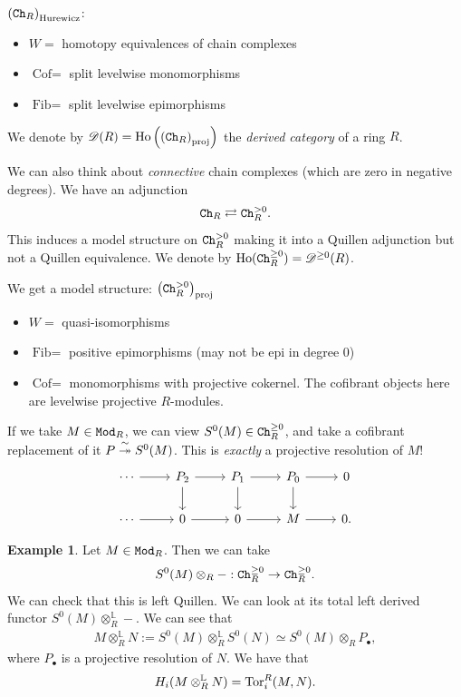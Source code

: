 \documentclass[12pt]{amsart}
\theoremstyle{definition}
\newtheorem{example}[theorem]{Example}
\providecommand{\Cof}{\text{Cof}}
\providecommand{\Fib}{\text{Fib}}
\begin{document}
$\left( \texttt{Ch}_R \right)_\text{Hurewicz}$:
\begin{itemize}
    \item $W=$ homotopy equivalences of chain complexes
    \item $\Cof=$ split levelwise monomorphisms
    \item $\Fib=$ split levelwise epimorphisms
\end{itemize}

We denote by $\mathscr{D}(R) = \text{Ho} \left( \left( \texttt{Ch}_R \right)_\text{proj} \right)$ the \textit{derived category} of a ring $R$.

We can also think about \textit{connective} chain complexes (which are zero in negative degrees). We have an adjunction
\begin{align*}
    \texttt{Ch}_R \rightleftarrows \texttt{Ch}_R^{>0}.
\end{align*}
This induces a model structure on $\texttt{Ch}_R^{>0}$ making it into a Quillen adjunction but not a Quillen equivalence. We denote by $\text{Ho}(\texttt{Ch}_R^{\ge 0}) = \mathscr{D}^{\ge 0}(R)$.

We get a model structure:
$\left( \texttt{Ch}_R^{>0} \right)_\text{proj}$
\begin{itemize}
    \item $W=$ quasi-isomorphisms
    \item $\Fib=$ positive epimorphisms (may not be epi in degree 0)
    \item $\Cof=$ monomorphisms with projective cokernel. The cofibrant objects here are levelwise projective $R$-modules.
\end{itemize}


If we take $M \in \texttt{Mod}_R$, we can view $S^0(M) \in \texttt{Ch}_R^{\ge 0}$, and take a cofibrant replacement of it $P \overset{\sim}{\twoheadrightarrow} S^0(M)$. This is \textit{exactly} a projective resolution of $M$!
\[ \begin{tikzcd}
    \cdots\rar & P_2\dar\rar & P_1\dar\rar & P_0\dar\rar & 0\\
    \cdots \rar & 0\rar & 0\rar & M\rar & 0.
\end{tikzcd} \]
%
\begin{example} Let $M \in \texttt{Mod}_R$. Then we can take
\begin{align*}
    S^0(M) \otimes_R - : \texttt{Ch}_R^{\ge 0} \to \texttt{Ch}_R^{\ge 0}.
\end{align*}
We can check that this is left Quillen. We can look at its total left derived functor $S^0(M) \otimes_R^{\mathbb{L}} -$. We can see that
\begin{align*}
    M \otimes_R^{\mathbb{L}} N := S^0(M) \otimes_R^{\mathbb{L}} S^0(N) \simeq S^0(M) \otimes_R P_\bullet,
\end{align*}
where $P_\bullet$ is a projective resolution of $N$. We have that
\begin{align*}
    H_i(M \otimes_R^{\mathbb{L}} N) = \text{Tor}_i^R(M,N).
\end{align*}
\end{example}
\end{document}
